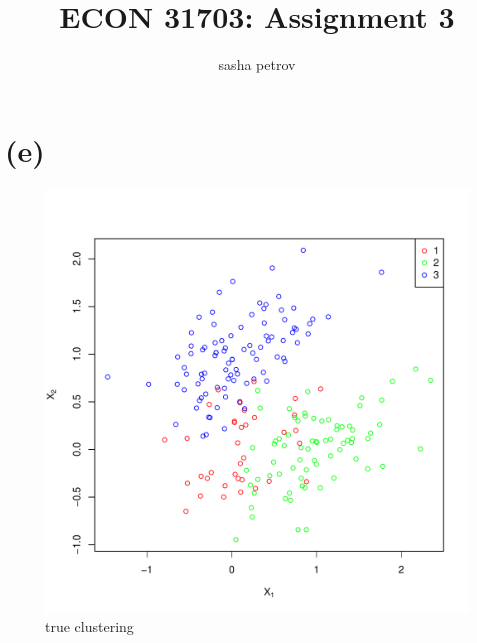 \documentclass[a4paper,12pt,twoside]{article}
\title{ECON 31703: Assignment 3}
\author{sasha petrov}
\begin{document}
\maketitle

\section*{(e)}

\begin{figure}[ht]
        \begin{minipage}[t]{0.45\linewidth}
            \centering
\includegraphics[width = \textwidth, keepaspectratio]{true_clustering.pdf}
                       \caption{true clustering}
            \label{fig:a}
        \end{minipage}
        \hspace{0.5cm}
        \begin{minipage}[t]{0.45\linewidth}
            \centering

\end{minipage}
\end{figure}
\end{document}
